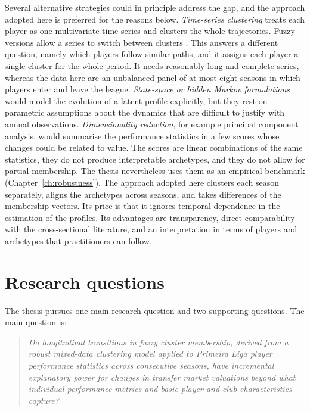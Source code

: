 Several alternative strategies could in principle address the gap, and the approach adopted here is preferred for the reasons below. \emph{Time-series clustering} treats each player as one multivariate time series and clusters the whole trajectories. Fuzzy versions allow a series to switch between clusters \cite{durso2009autocorrelation}. This answers a different question, namely which players follow similar paths, and it assigns each player a single cluster for the whole period. It needs reasonably long and complete series, whereas the data here are an unbalanced panel of at most eight seasons in which players enter and leave the league. \emph{State-space or hidden Markov formulations} would model the evolution of a latent profile explicitly, but they rest on parametric assumptions about the dynamics that are difficult to justify with annual observations. \emph{Dimensionality reduction}, for example principal component analysis, would summarise the performance statistics in a few scores whose changes could be related to value. The scores are linear combinations of the same statistics, they do not produce interpretable archetypes, and they do not allow for partial membership. The thesis nevertheless uses them as an empirical benchmark (Chapter~\ref{ch:robustness}). The approach adopted here clusters each season separately, aligns the archetypes across seasons, and takes differences of the membership vectors. Its price is that it ignores temporal dependence in the estimation of the profiles. Its advantages are transparency, direct comparability with the cross-sectional literature, and an interpretation in terms of players and archetypes that practitioners can follow.

\section{Research questions}
\label{sec:lit-questions}

The thesis pursues one main research question and two supporting questions. The main question is:

\begin{quote}
\emph{Do longitudinal transitions in fuzzy cluster membership, derived from a robust mixed-data clustering model applied to Primeira Liga player performance statistics across consecutive seasons, have incremental explanatory power for changes in transfer market valuations beyond what individual performance metrics and basic player and club characteristics capture?}
\end{quote}

